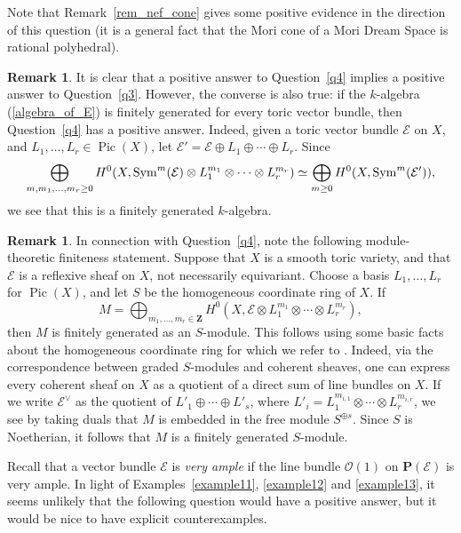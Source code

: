 \documentclass[12pt]{amsart}
\theoremstyle{definition}
\newtheorem{remark}[lemma]{Remark}
\theoremstyle{remark}
\begin{document}
\noindent Note that Remark~\ref{rem_nef_cone} gives some positive evidence in the
direction of this question (it is a general fact that the Mori cone of a Mori Dream
Space is rational polyhedral).

\begin{remark}\label{equivalent}
It is clear that a positive answer to Question~\ref{q4} implies a positive answer to Question~\ref{q3}.
However, the converse is also true: if the $k$-algebra (\ref{algebra_of_E})
is finitely generated for every toric vector bundle, then Question~\ref{q4} has a positive answer.
Indeed, given a toric vector bundle ${\mathcal{E}}$ on $X$, and $L_1,\ldots,L_r\in\operatorname{Pic}(X)$, let
${\mathcal{E}}'={\mathcal{E}}\oplus L_1\oplus\cdots\oplus L_r$. Since
$$\bigoplus_{m,m_1,\ldots,m_r\geq 0}H^0(X,{\rm Sym}^m({\mathcal{E}})\otimes
L_1^{m_1}\otimes\cdots\otimes L_r^{m_r})
\simeq\bigoplus_{m\geq 0}H^0(X, {\rm Sym}^m({\mathcal{E}}')),$$
we see that this is a finitely generated $k$-algebra.
\end{remark}

\begin{remark}
In connection with Question~\ref{q4}, note the following module-theoretic finiteness
statement. 
 Suppose that $X$ is a smooth toric variety, and that ${\mathcal{E}}$ is a reflexive sheaf
on $X$, not necessarily equivariant.
Choose a basis $L_1,\ldots,L_r$ for $\operatorname{Pic}(X)$, and let $S$ 
be the homogeneous coordinate ring of $X$. If 
$$M=\bigoplus_{m_1,\ldots,m_r\in{{\mathbf Z}}}H^0(X,{\mathcal{E}}\otimes L_1^{m_1}\otimes\cdots\otimes
L_r^{m_r}),$$
then $M$ is finitely generated as an $S$-module.  This follows using some basic facts about the homogeneous coordinate ring for which we refer to \cite{Cox}. Indeed, via the correspondence
between graded $S$-modules and coherent sheaves, one can express every coherent sheaf on 
$X$ as a quotient of a direct sum of line bundles on $X$. If we write ${\mathcal{E}}^{\vee}$ as the quotient 
of $L'_1\oplus\cdots\oplus L'_s$, where $L'_i=L_1^{m_{i,1}}\otimes\cdots\otimes L_r^{m_{i,r}}$,
we see by taking duals that $M$ is embedded in the free module $S^{\oplus s}$. Since $S$ is Noetherian, it follows that $M$ is a finitely generated $S$-module.
\end{remark}

\bigskip

Recall that a vector bundle ${\mathcal{E}}$ is \emph{very ample} if the line
bundle ${\mathcal{O}}(1)$ on ${{\mathbf P}}({\mathcal{E}})$ is very ample. In light of Examples~\ref{example11}, \ref{example12}
and \ref{example13}, it seems unlikely that the following question would have a positive answer,
but it would be nice to have explicit counterexamples.
\end{document}
